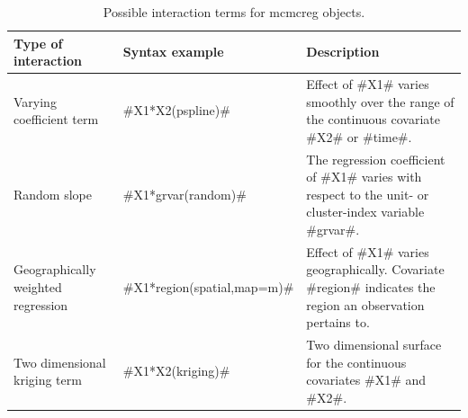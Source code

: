 \begin{table}[ht] \footnotesize
\begin{center}
\begin{tabular}{|p{3.5cm}|p{3.8cm}|p{5.9cm}|}
\hline
{\bf Type of interaction} & {\bf Syntax example} & {\bf Description} \\
\hline
\hline
Varying coefficient term &  #X1*X2(pspline)#
 & Effect of
#X1# varies smoothly over the range of the continuous covariate #X2# or #time#. \\
\hline Random slope & #X1*grvar(random)#  &  The regression
coefficient of #X1# varies with respect
to the unit- or cluster-index variable #grvar#. \\
\hline Geographically weighted \newline regression &
#X1*region(spatial,map=m)#  & Effect of #X1# varies
geographically. Covariate
#region# indicates the region an observation pertains to. \\
\hline Two dimensional \newline kriging term &  #X1*X2(kriging)#
& Two dimensional surface for the continuous
covariates #X1# and #X2#. \\
 \hline
\end{tabular}
{\em\caption {\label{mcmcreginteractions} Possible interaction terms for mcmcreg objects.}}
\end{center}
\end{table}





















